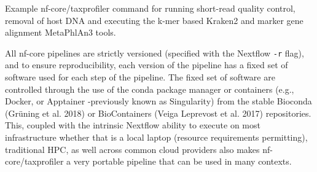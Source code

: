 \documentclass[
]{article}
\newenvironment{Shaded}{}{}
\newcommand{\AttributeTok}[1]{\textcolor[rgb]{0.84,0.23,0.29}{#1}}
\newcommand{\DataTypeTok}[1]{\textcolor[rgb]{0.84,0.23,0.29}{#1}}
\newcommand{\ExtensionTok}[1]{\textcolor[rgb]{0.84,0.23,0.29}{\textbf{#1}}}
\newcommand{\NormalTok}[1]{\textcolor[rgb]{0.14,0.16,0.18}{#1}}
\newcommand{\OperatorTok}[1]{\textcolor[rgb]{0.14,0.16,0.18}{#1}}
\newcommand{\StringTok}[1]{\textcolor[rgb]{0.01,0.18,0.38}{#1}}
\begin{document}
\begin{codelisting}

\caption{Example nf-core/taxprofiler command for running short-read
quality control, removal of host DNA and executing the k-mer based
Kraken2 and marker gene alignment MetaPhlAn3 tools.}

\hypertarget{lst-example-cmd}{%
\label{lst-example-cmd}}%
\begin{Shaded}
\end{Shaded}

\end{codelisting}

All nf-core pipelines are strictly versioned (specified with the
Nextflow \texttt{-r} flag), and to ensure reproducibility, each version
of the pipeline has a fixed set of software used for each step of the
pipeline. The fixed set of software are controlled through the use of
the conda package manager or containers (e.g., Docker, or Apptainer
-previously known as Singularity) from the stable Bioconda (Grüning et
al. 2018) or BioContainers (Veiga Leprevost et al. 2017) repositories.
This, coupled with the intrinsic Nextflow ability to execute on most
infrastructure whether that is a local laptop (resource requirements
permitting), traditional HPC, as well across common cloud providers also
makes nf-core/taxprofiler a very portable pipeline that can be used in
many contexts.
\end{document}
